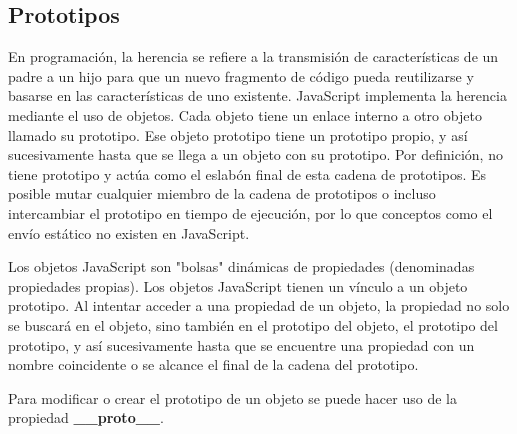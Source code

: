 \documentclass{article}
\begin{document}
\subsection*{Prototipos}

En programación, la herencia se refiere a la transmisión de características de un padre a un hijo para que un nuevo fragmento de código pueda reutilizarse
y basarse en las características de uno existente. JavaScript implementa la herencia mediante el uso de objetos. Cada objeto tiene un enlace interno a otro
objeto llamado su prototipo. Ese objeto prototipo tiene un prototipo propio, y así sucesivamente hasta que se llega a un objeto con su prototipo. Por definición,
no tiene prototipo y actúa como el eslabón final de esta cadena de prototipos. Es posible mutar cualquier miembro de la cadena de prototipos o incluso intercambiar
el prototipo en tiempo de ejecución, por lo que conceptos como el envío estático no existen en JavaScript.

Los objetos JavaScript son "bolsas" dinámicas de propiedades (denominadas propiedades propias). Los objetos JavaScript tienen un vínculo a un objeto prototipo.
Al intentar acceder a una propiedad de un objeto, la propiedad no solo se buscará en el objeto, sino también en el prototipo del objeto, el prototipo del prototipo,
y así sucesivamente hasta que se encuentre una propiedad con un nombre coincidente o se alcance el final de la cadena del prototipo.

Para modificar o crear el prototipo de un objeto se puede hacer uso de la propiedad \textbf{\_\_proto\_\_}.
\end{document}
